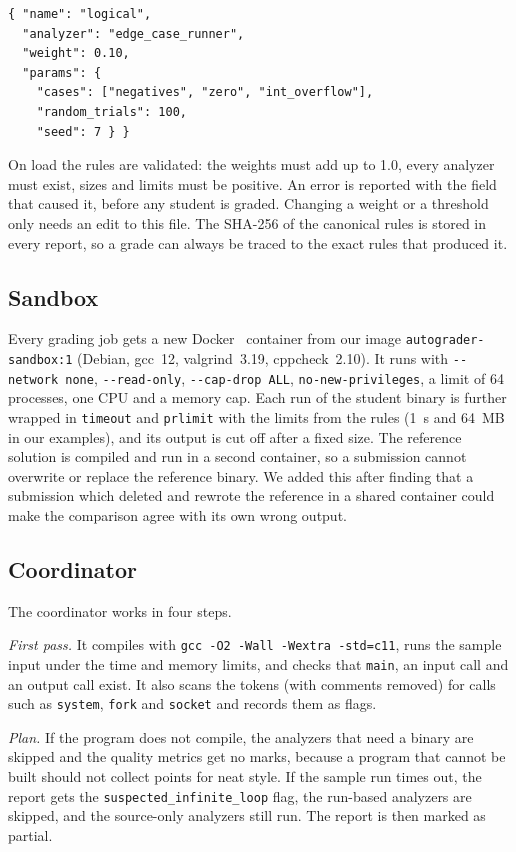 \documentclass[conference]{IEEEtran}
\newcommand{\code}[1]{\texttt{#1}}
\begin{document}
\begin{lstlisting}
{ "name": "logical",
  "analyzer": "edge_case_runner",
  "weight": 0.10,
  "params": {
    "cases": ["negatives", "zero", "int_overflow"],
    "random_trials": 100,
    "seed": 7 } }
\end{lstlisting}

On load the rules are validated: the weights must add up to 1.0, every analyzer must exist,
sizes and limits must be positive. An error is reported with the field that caused it, before
any student is graded. Changing a weight or a threshold only needs an edit to this file. The
SHA-256 of the canonical rules is stored in every report, so a grade can always be traced to
the exact rules that produced it.

\subsection{Sandbox}
Every grading job gets a new Docker~\cite{merkel2014} container from our image \code{autograder-sandbox:1} (Debian,
gcc~12, valgrind~3.19, cppcheck~2.10). It runs with \code{-{}-network none},
\code{-{}-read-only}, \code{-{}-cap-drop ALL}, \code{no-new-privileges}, a limit of 64 processes,
one CPU and a memory cap. Each run of the student binary is further wrapped in \code{timeout}
and \code{prlimit} with the limits from the rules (1~s and 64~MB in our examples), and its
output is cut off after a fixed size. The reference solution is compiled and run in a second
container, so a submission cannot overwrite or replace the reference binary. We added this
after finding that a submission which deleted and rewrote the reference in a shared container
could make the comparison agree with its own wrong output.

\subsection{Coordinator}
The coordinator works in four steps.

\emph{First pass.} It compiles with \code{gcc -O2 -Wall -Wextra -std=c11}, runs the sample
input under the time and memory limits, and checks that \code{main}, an input call and an output
call exist. It also scans the tokens (with comments removed) for calls such as \code{system},
\code{fork} and \code{socket} and records them as flags.

\emph{Plan.} If the program does not compile, the analyzers that need a binary are skipped and
the quality metrics get no marks, because a program that cannot be built should not collect
points for neat style. If the sample run times out, the report gets the
\code{suspected\_infinite\_loop} flag, the run-based analyzers are skipped, and the source-only
analyzers still run. The report is then marked as partial.
\end{document}
